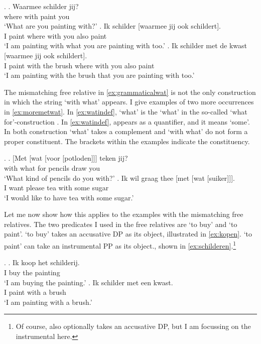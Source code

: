 \documentclass{article}
\begin{document}
\ex.\label{ex:constwaarmee}
\ag. Waarmee schilder jij?\\
 {where with} paint you\\
 `What are you painting with?'
\bg. Ik schilder [waarmee jij ook schildert].\\
 I paint {where with} you also paint\\
 `I am painting with what you are painting with too.'
\bg. Ik schilder met de kwast [waarmee jij ook schildert].\\
 I paint with the brush {where with} you also paint\\
 `I am painting with the brush that you are painting with too.'

The mismatching free relative in \ref{ex:grammaticalwat} is not the only construction in which the string  `with what' appears. I give examples of two more occurrences in \ref{ex:moremetwat}. In \ref{ex:watindef},  `what' is the  `what' in the so-called  `what for'-construction \citep[cf.][]{corver1991}.
In \ref{ex:watindef},  appears as a quantifier, and it means `some'. In both construction  `what' takes a complement and  `with what' do not form a proper constituent. The brackets within the examples indicate the constituency.

\ex.\label{ex:moremetwat}
\ag. [Met [wat [voor [potloden]]] teken jij?\\
 with what for pencils draw you\\
 `What kind of pencils do you with?'\label{ex:watwasfur}
\bg. Ik wil graag thee [met [wat [suiker]]].\\
 I want please tea with some sugar\\
 `I would like to have tea with some sugar.'\label{ex:watindef}

Let me now show how this applies to the examples with the mismatching free relatives. The two predicates I used in the free relatives are  `to buy' and   `to paint'.  `to buy' takes an accusative DP as its object, illustrated in \ref{ex:kopen}.  `to paint' can take an instrumental PP as its object., shown in \ref{ex:schilderen}.\footnote{Of course,  also optionally takes an accusative DP, but I am focussing on the instrumental here.}

\ex.
\ag. Ik koop het schilderij.\\
 I buy the painting\\
 `I am buying the painting.'\label{ex:kopen}
\bg. Ik schilder met een kwast.\\
 I paint with a brush\\
 `I am painting with a brush.'\label{ex:schilderen}
\end{document}
